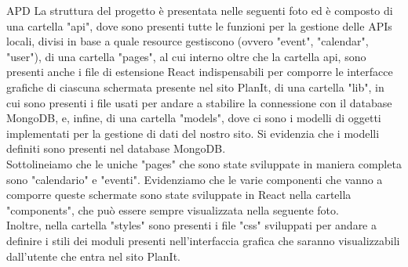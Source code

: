 \begin{listaPersonale} {APD}
    La struttura del progetto è presentata nelle seguenti foto ed è composto di una cartella "api", dove sono presenti tutte le funzioni per la gestione delle APIs locali, divisi in base a quale resource gestiscono (ovvero "event", "calendar", "user"), di una cartella "pages", al cui interno oltre che la cartella api, sono presenti anche i file di estensione React indispensabili per comporre le interfacce grafiche di ciascuna schermata presente nel sito PlanIt, di una cartella "lib", in cui sono presenti i file usati per andare a stabilire la connessione con il database MongoDB, e, infine, di una cartella "models", dove ci sono i modelli di oggetti implementati per la gestione di dati del nostro sito. Si evidenzia che i modelli definiti sono presenti nel database MongoDB.\\
    Sottolineiamo che le uniche "pages" che sono state sviluppate in maniera completa sono "calendario" e "eventi". Evidenziamo che le varie componenti che vanno a comporre queste schermate sono state sviluppate in React nella cartella "components", che può essere sempre visualizzata nella seguente foto.\\
    Inoltre, nella cartella "styles" sono presenti i file "css" sviluppati per andare a definire i stili dei moduli presenti nell'interfaccia grafica che saranno visualizzabili dall'utente che entra nel sito PlanIt.
    \begin{center}

\end{center}
\end{listaPersonale}
